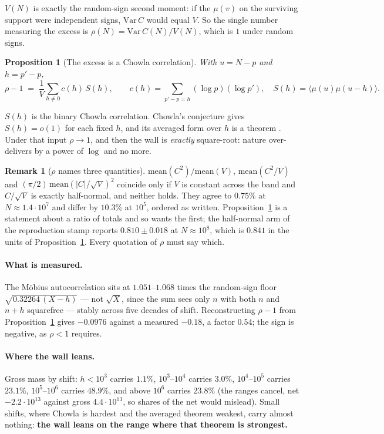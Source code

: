 \documentclass[11pt,a4paper]{article}
\theoremstyle{plain}
\newtheorem{proposition}[theorem]{Proposition}
\theoremstyle{definition}
\newtheorem{remark}[theorem]{Remark}
\begin{document}
$V(N)$ is exactly the random-sign second moment: if the $\mu(v)$ on the
surviving support were independent signs, $\mathrm{Var}\,C$ would equal
$V$. So the single number measuring the excess is
$\rho(N) = \mathrm{Var}\,C(N)/V(N)$, which is $1$ under random signs.

\begin{proposition}[The excess is a Chowla correlation]\label{prop:W}
With $u=N-p$ and $h=p'-p$,
\[
  \rho-1 \;=\; \frac1V\sum_{h\neq0} c(h)\,S(h),
  \qquad
  c(h)=\sum_{p'-p=h}(\log p)(\log p'),
  \quad
  S(h)=\bigl\langle \mu(u)\mu(u-h)\bigr\rangle .
\]
\end{proposition}

$S(h)$ is the binary Chowla correlation. Chowla's conjecture gives
$S(h)=o(1)$ for each fixed $h$, and its averaged form over $h$ is a
theorem \cite{MRT15}. Under that input $\rho\to1$, and then the wall is
\emph{exactly} square-root: nature over-delivers by a power of $\log$
and no more.

\begin{remark}[$\rho$ names three quantities]\label{rem:rho}
$\mathrm{mean}(C^2)/\mathrm{mean}(V)$, $\mathrm{mean}(C^2/V)$ and
$(\pi/2)\,\mathrm{mean}(|C|/\sqrt V)^2$ coincide only if $V$ is
constant across the band and $C/\sqrt V$ is exactly half-normal, and
neither holds. They agree to $0.75\%$ at $N\approx1.4\cdot10^7$ and
differ by $10.3\%$ at $10^5$, ordered as written. Proposition~\ref{prop:W}
is a statement about a ratio of totals and so wants the first; the
half-normal arm of the reproduction stamp reports $0.810\pm0.018$ at
$N\approx10^8$, which is $0.841$ in the units of
Proposition~\ref{prop:W}. Every quotation of $\rho$ must say which.
\end{remark}

\paragraph{What is measured.} The M\"obius autocorrelation sits at
$1.051$--$1.068$ times the random-sign floor $\sqrt{0.32264\,(X-h)}$
--- not $\sqrt X$, since the sum sees only $n$ with both $n$ and $n+h$
squarefree --- stably across five decades of shift. Reconstructing
$\rho-1$ from Proposition~\ref{prop:W} gives $-0.0976$ against a
measured $-0.18$, a factor $0.54$; the sign is negative, as $\rho<1$
requires.

\paragraph{Where the wall leans.} Gross mass by shift:
$h<10^3$ carries $1.1\%$, $10^3$--$10^4$ carries $3.0\%$,
$10^4$--$10^5$ carries $23.1\%$, $10^5$--$10^6$ carries $48.9\%$, and
above $10^6$ carries $23.8\%$ (the ranges cancel, net $-2.2\cdot10^{13}$
against gross $4.4\cdot10^{13}$, so shares of the net would mislead).
Small shifts, where Chowla is hardest and the averaged theorem weakest,
carry almost nothing: \textbf{the wall leans on the range where that
theorem is strongest.}
\end{document}
